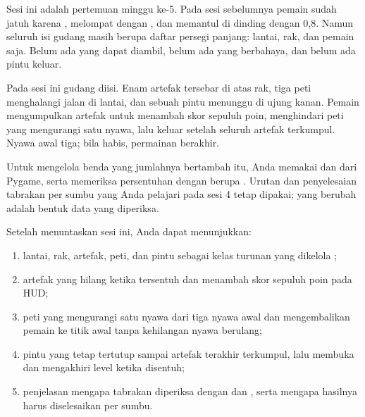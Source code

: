 

Sesi ini adalah pertemuan minggu ke-5. Pada sesi sebelumnya pemain sudah
jatuh karena , melompat dengan , dan
memantul di dinding dengan  0,8. Namun seluruh isi
gudang masih berupa daftar persegi panjang: lantai, rak, dan pemain saja.
Belum ada yang dapat diambil, belum ada yang berbahaya, dan belum ada pintu
keluar.

Pada sesi ini gudang diisi. Enam artefak tersebar di atas rak, tiga peti
menghalangi jalan di lantai, dan sebuah pintu menunggu di ujung kanan. Pemain
mengumpulkan artefak untuk menambah skor sepuluh poin, menghindari peti yang
mengurangi satu nyawa, lalu keluar setelah seluruh artefak terkumpul. Nyawa
awal tiga; bila habis, permainan berakhir.

Untuk mengelola benda yang jumlahnya bertambah itu, Anda memakai
 dan  dari Pygame, serta memeriksa persentuhan
dengan  berupa . Urutan  dan
penyelesaian tabrakan per sumbu yang Anda pelajari pada sesi 4 tetap dipakai;
yang berubah adalah bentuk data yang diperiksa.


\begin{tujuanbox}
Setelah menuntaskan sesi ini, Anda dapat menunjukkan:
\begin{enumerate}[leftmargin=1.5em, itemsep=0.2em]
  \item lantai, rak, artefak, peti, dan pintu sebagai kelas turunan
         yang dikelola ;
  \item artefak yang hilang ketika tersentuh dan menambah skor sepuluh poin
        pada HUD;
  \item peti yang mengurangi satu nyawa dari tiga nyawa awal dan mengembalikan
        pemain ke titik awal tanpa kehilangan nyawa berulang;
  \item pintu yang tetap tertutup sampai artefak terakhir terkumpul, lalu
        membuka dan mengakhiri level ketika disentuh;
  \item penjelasan mengapa tabrakan diperiksa dengan  dan
        , serta mengapa hasilnya harus diselesaikan per
        sumbu.
\end{enumerate}
\end{tujuanbox}

